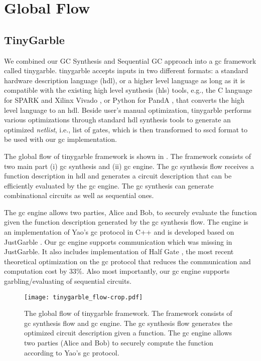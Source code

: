 \section{Global Flow}
\subsection{TinyGarble}
We combined our GC Synthesis and Sequential GC approach into a gc framework called \gls{tinygarble}.
\gls{tinygarble} accepts inputs in two different formats: a standard hardware description language (\acrshort{hdl}), or a higher level language as long as it is compatible with the existing high level synthesis (\acrshort{hls}) tools, e.g., the C language for  SPARK \cite{Gupta2004} and Xilinx Vivado \cite{tool:Vivado}, or Python for PandA \cite{tool:PandA}, that converts the high level language to an \acrshort{hdl}.
Beside user's manual optimization, \gls{tinygarble} performs various optimizations through standard \acrshort{hdl} synthesis tools to generate an optimized \emph{netlist}, i.e., list of gates, which is then transformed to \acrfull{sscd} format to be used with our \acrshort{gc} implementation.

The global flow of \gls{tinygarble} framework is shown in .
The framework consists of two main part (i) \acrshort{gc} synthesis and (ii) \acrshort{gc} engine.
The \acrshort{gc} synthesis flow receives a function description in \acrshort{hdl} and generates a circuit description that can be efficiently evaluated by the \acrshort{gc} engine.
The \acrshort{gc} synthesis can generate combinational circuits as well as sequential ones.

The \acrshort{gc} engine allows two parties, Alice and Bob, to securely evaluate the function given the function description generated by the \acrshort{gc} synthesis flow.
The engine is an implementation of Yao's \acrshort{gc} protocol in C++ and is developed based on JustGarble \cite{bellare2013efficient}.
Our \acrshort{gc} engine supports communication which was missing in JustGarble.
It also includes implementation of Half Gate \cite{zahur2015two}, the most recent theoretical optimization on the \acrshort{gc} protocol that reduces the communication and computation cost by 33\%.
Also most importantly, our \acrshort{gc} engine supports garbling/evaluating of sequential circuits.


\begin{figure}
\centering
\texttt{[image: tinygarble\_flow-crop.pdf]}
\caption{The global flow of \gls{tinygarble} framework.
The framework consists of \acrshort{gc} synthesis flow and \acrshort{gc} engine.
The \acrshort{gc} synthesis flow generates the optimized circuit description given a function.
The \acrshort{gc} engine allows two parties (Alice and Bob) to securely compute the function according to Yao's \acrshort{gc} protocol.
}
\label{fig:tinygarbel-global-flow}
\end{figure}

